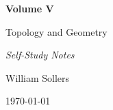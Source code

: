 \begin{titlepage}
\centering

\vspace*{5cm}

{\Huge\bfseries Volume V\par}

\vspace{0.5cm}

{\LARGE Topology and Geometry\par}

\vspace{0.5cm}

{\large\itshape Self-Study Notes\par}

\vfill

{\large William Sollers\par}

\vspace{0.5cm}

{\large \today\par}

\end{titlepage}
